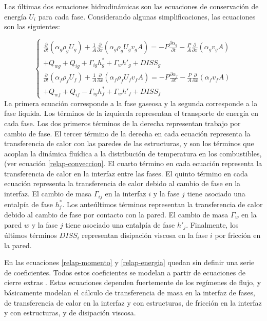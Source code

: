 Las últimas dos ecuaciones hidrodinámicas son las ecuaciones de conservación de energía $U_i$ para cada fase.
Considerando algunas simplificaciones\cite{manual-relap-modelos}, las ecuaciones son las siguientes:

\begin{equation}
\left \{
\begin{array}{r}
\frac{\partial}{\partial t} \left( \alpha_g \rho_g U_g\right) + \frac{1}{A} \frac{\partial}{\partial x} \left ( \alpha_g \rho_g U_g v_g A \right ) = 
-P \frac{\partial \alpha_g}{\partial t} - \frac{P}{A} \frac{\partial}{\partial x} \left( \alpha_g v_g A \right ) \\
+ Q_{wg} + Q_{ig} + \Gamma_{ig}h^*_g + \Gamma_w {h}'_g + DISS_g \\

\frac{\partial}{\partial t} \left( \alpha_f \rho_f U_f\right) + \frac{1}{A} \frac{\partial}{\partial x} \left ( \alpha_f \rho_f U_f v_f A \right ) = 
-P \frac{\partial \alpha_f}{\partial t} - \frac{P}{A} \frac{\partial}{\partial x} \left( \alpha_f v_f A \right ) \\
+ Q_{wf} + Q_{if} - \Gamma_{ig}h^*_f + \Gamma_w {h}'_f + DISS_f
\end{array}
\right .
\label{relap-energia}
\end{equation}
La primera ecuación corresponde a la fase gaseosa y la segunda corresponde a la fase líquida.
Los términos de la izquierda representan el transporte de energía en cada fase.
Los dos primeros términos de la derecha representan trabajo por cambio de fase.
El tercer término de la derecha en cada ecuación representa la transferencia de calor con las paredes de las estructuras,
y son los términos que acoplan la dinámica fluídica a la distribución de temperatura en los combustibles, (ver ecuación \ref{relap-conveccion}.
El cuarto término en cada ecuación representa la transferencia de calor en la interfaz entre las fases.
El quinto término en cada ecuación representa la transferencia de calor debido al cambio de fase en la interfaz.
El cambio de masa $\Gamma_{ij}$ en la interfaz $i$ y la fase $j$ tiene asociado una entalpía de fase $h^*_j$.
Los anteúltimos términos representan la transferencia de calor debido al cambio de fase por contacto con la pared.
El cambio de masa $\Gamma_{w}$ en la pared $w$ y la fase $j$ tiene asociado una entalpía de fase ${h}'_j$.
Finalmente, los últimos términos $DISS_i$ representan disipación viscosa en la fase $i$ por fricción en la pared.

En las ecuaciones \ref{relap-momento} y \ref{relap-energia} quedan sin definir una serie de coeficientes.
Todos estos coeficientes se modelan a partir de ecuaciones de cierre extras \cite{manual-relap-modelos}.
Estas ecuaciones dependen fuertemente de los regímenes de flujo, y básicamente modelan
el cálculo de transferencia de masa en la interfaz de fases,
de transferencia de calor en la interfaz y con estructuras,
de fricción en la interfaz y con estructuras, y
de disipación viscosa.


